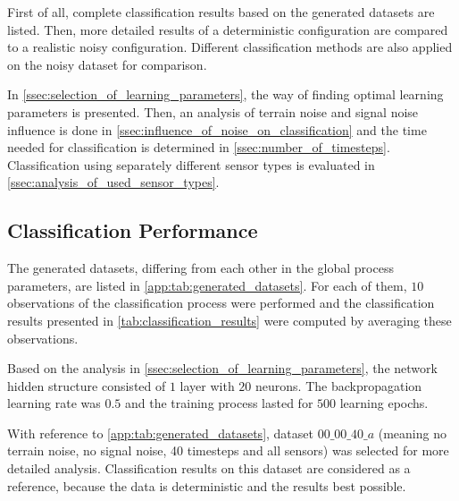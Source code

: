 First of all, complete classification results based on the generated datasets are listed. Then, more detailed results of a deterministic configuration are  compared to a realistic noisy configuration. Different classification methods are also applied on the noisy dataset for comparison.

In \cref{ssec:selection_of_learning_parameters}, the way of finding optimal learning parameters is presented. Then, an analysis of terrain noise and signal noise influence is done in \cref{ssec:influence_of_noise_on_classification} and the time needed for classification is determined in \cref{ssec:number_of_timesteps}. Classification using separately different sensor types is evaluated in \cref{ssec:analysis_of_used_sensor_types}.

\subsection{Classification Performance} \label{ssec:classification_performance}
The generated datasets, differing from each other in the global process parameters, are listed in \cref{app:tab:generated_datasets}. For each of them, $ 10 $ observations of the classification process were performed and the classification results presented in \cref{tab:classification_results} were computed by averaging these observations.

Based on the analysis in \cref{ssec:selection_of_learning_parameters}, the network hidden structure consisted of $ 1 $ layer with $ 20 $ neurons. The backpropagation learning rate was $ 0.5 $ and the training process lasted for $ 500 $ learning epochs.

With reference to \cref{app:tab:generated_datasets}, dataset $ 00\_00\_40\_a $ (meaning no terrain noise, no signal noise, 40 timesteps and all sensors) was selected for more detailed analysis. Classification results on this dataset are considered as a reference, because the data is deterministic and the results best possible.

